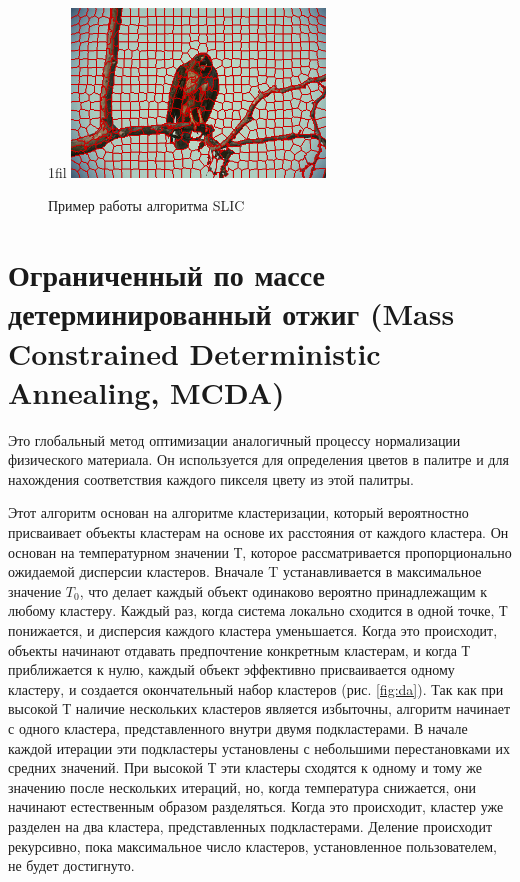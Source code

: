 \documentclass[a4paper,12pt]{report}
\makeatletter
\theoremstyle{remark}
\newcommand*{\centerfloat}{%
  \parindent \z@
  \leftskip \z@ \@plus 1fil \@minus \textwidth
  \rightskip\leftskip
  \parfillskip \z@skip}
\makeatother
\begin{document}
\begin{figure}
    \centerfloat
    \includegraphics[width=0.6\textwidth]{pixel/slic.png}
    \caption{Пример работы алгоритма SLIC}
    \label{fig:slic}
\end{figure}

\section{Ограниченный по массе детерминированный отжиг (Mass Constrained Deterministic Annealing, MCDA)}

Это глобальный метод оптимизации аналогичный процессу нормализации физического материала\citep{da}. Он используется для определения цветов в палитре и для нахождения соответствия каждого пикселя цвету из этой палитры.

Этот алгоритм основан на алгоритме кластеризации, который вероятностно присваивает объекты кластерам на основе их расстояния от каждого кластера. Он основан на температурном значении Т, которое рассматривается пропорционально ожидаемой дисперсии кластеров. Вначале T устанавливается в максимальное значение $T_0$, что делает каждый объект одинаково вероятно принадлежащим к любому кластеру. Каждый раз, когда система локально сходится в одной точке, $Т$ понижается, и дисперсия каждого кластера уменьшается. Когда это происходит, объекты начинают отдавать предпочтение конкретным кластерам, и когда $Т$ приближается к нулю, каждый объект эффективно присваивается одному кластеру, и создается окончательный набор кластеров (рис. \ref{fig:da}). Так как при высокой $Т$ наличие нескольких кластеров является избыточны, алгоритм начинает с одного кластера, представленного внутри двумя подкластерами\citep{pixel}. В начале каждой итерации эти подкластеры установлены с небольшими перестановками их средних значений. При высокой $Т$ эти кластеры сходятся к одному и тому же значению после нескольких итераций, но, когда температура снижается, они начинают естественным образом разделяться. Когда это происходит, кластер уже разделен на два кластера, представленных подкластерами. Деление происходит рекурсивно, пока максимальное число кластеров, установленное пользователем, не будет достигнуто.
\end{document}
